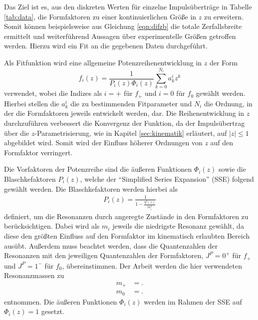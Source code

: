 Das Ziel ist es, aus den diskreten Werten für einzelne Impulsüberträge in Tabelle \ref{tab:data}, die Formfaktoren zu einer kontinuierlichen Größe in $z$ zu erweitern.
Somit können beispielsweise aus Gleichung \eqref{eqn:difzb} die totale Zerfallsbreite ermittelt und weiterführend Aussagen über experimentelle Größen getroffen werden.
Hierzu wird ein Fit an die gegebenen Daten durchgeführt. 

Als Fitfunktion wird eine allgemeine Potenzreihenentwicklung in $z$ der Form
\begin{equation}
  \label{eqn:reihenentwicklung}
  f_i(z) = \frac{1}{P_i(z) \Phi_i(z)} \sum_{k=0}^{N_i} a_{k}^{i} z^{k}
\end{equation}
verwendet, wobei die Indizes als $i=+$ für $f_+$ und $i=0$ für $f_0$ gewählt werden.
Hierbei stellen die $a_{k}^{i}$ die zu bestimmenden Fitparameter und $N_i$ die Ordnung, in der die Formfaktoren jeweils entwickelt werden, dar.
Die Reihenentwicklung in $z$ durchzuführen verbessert die Konvergenz der Funktion, da der Impulsübertrag über die $z$-Parametrisierung, wie in Kapitel \ref{sec:kinematik} erläutert, auf $\lvert z \rvert \leq 1$ abgebildet wird.
Somit wird der Einfluss höherer Ordnungen von $z$ auf den Formfaktor verringert.

Die Vorfaktoren der Potenzreihe sind die äußeren Funktionen $\Phi_i(z)$ sowie die Blaschkefaktoren $P_i(z)$, welche der \enquote{Simplified Series Expansion} (SSE) \cite{PhysRevD.79.013008} folgend gewählt werden.
Die Blaschkefaktoren werden hierbei als
\begin{align*}
  P_i(z) = \frac{1}{1 - \frac{q^2(z)}{m_i^2}}
\end{align*}
definiert, um die Resonanzen durch angeregte Zustände in den Formfaktoren zu berücksichtigen.
Dabei wird als $m_i$ jeweils die niedrigste Resonanz gewählt, da diese den größten Einfluss auf den Formfaktor im kinematisch erlaubten Bereich ausübt.
Außerdem muss beachtet werden, dass die Quantenzahlen der Resonanzen mit den jeweiligen Quantenzahlen der Formfaktoren, $J^P = 0^{+}$ für $f_+$ und $J^P = 1^-$ für $f_0$, übereinstimmen.
Der Arbeit \cite{PhysRevD.94.094008} werden die hier verwendeten Resonanzmassen zu
\begin{align*}
  m_+ &= .\\
  m_0 & = .
\end{align*}
entnommen.
Die äußeren Funktionen $\Phi_i(z)$ werden im Rahmen der SSE auf $\Phi_i(z) = \num{1}$ gesetzt.

